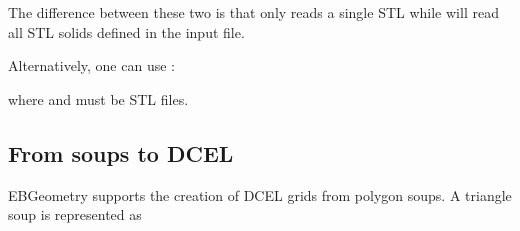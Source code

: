 \documentclass[letterpaper,10pt,english]{sphinxmanual}
\begin{document}
\sphinxAtStartPar
The difference between these two is that  only reads a single STL  while  will read all STL solids defined in the input file.

\sphinxAtStartPar
Alternatively, one can use :

\begin{sphinxVerbatim}[commandchars=\\\{\}]
  
  
   

  
  
   
\end{sphinxVerbatim}

\sphinxAtStartPar
where  and  must be STL files.


\subsection{From soups to DCEL}
\label{\detokenize{Parsers:from-soups-to-dcel}}\label{\detokenize{Parsers:chap-polysoups}}
\sphinxAtStartPar
EBGeometry supports the creation of DCEL grids from polygon soups.
A triangle soup is represented as
\end{document}

